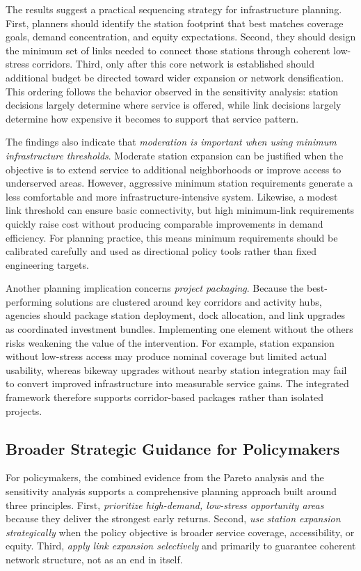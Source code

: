 \documentclass[preprint,authoryear,10pt]{elsarticle}
\begin{document}
The results suggest a practical sequencing strategy for infrastructure planning. First, planners should identify the station footprint that best matches coverage goals, demand concentration, and equity expectations. Second, they should design the minimum set of links needed to connect those stations through coherent low-stress corridors. Third, only after this core network is established should additional budget be directed toward wider expansion or network densification. This ordering follows the behavior observed in the sensitivity analysis: station decisions largely determine where service is offered, while link decisions largely determine how expensive it becomes to support that service pattern.

The findings also indicate that \textit{moderation is important when using minimum infrastructure thresholds}. Moderate station expansion can be justified when the objective is to extend service to additional neighborhoods or improve access to underserved areas. However, aggressive minimum station requirements generate a less comfortable and more infrastructure-intensive system. Likewise, a modest link threshold can ensure basic connectivity, but high minimum-link requirements quickly raise cost without producing comparable improvements in demand efficiency. For planning practice, this means minimum requirements should be calibrated carefully and used as directional policy tools rather than fixed engineering targets.

Another planning implication concerns \textit{project packaging}. Because the best-performing solutions are clustered around key corridors and activity hubs, agencies should package station deployment, dock allocation, and link upgrades as coordinated investment bundles. Implementing one element without the others risks weakening the value of the intervention. For example, station expansion without low-stress access may produce nominal coverage but limited actual usability, whereas bikeway upgrades without nearby station integration may fail to convert improved infrastructure into measurable service gains. The integrated framework therefore supports corridor-based packages rather than isolated projects.

\subsection{Broader Strategic Guidance for Policymakers}

For policymakers, the combined evidence from the Pareto analysis and the sensitivity analysis supports a comprehensive planning approach built around three principles. First, \textit{prioritize high-demand, low-stress opportunity areas} because they deliver the strongest early returns. Second, \textit{use station expansion strategically} when the policy objective is broader service coverage, accessibility, or equity. Third, \textit{apply link expansion selectively} and primarily to guarantee coherent network structure, not as an end in itself.
\end{document}
